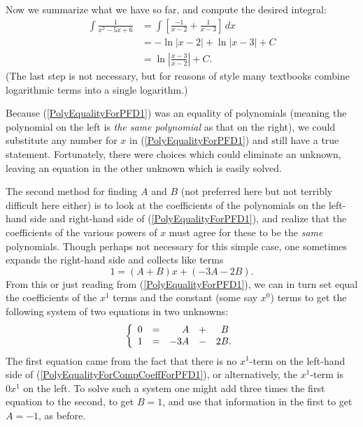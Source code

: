 Now we summarize what we have so far, and compute the desired integral:
\begin{align*}
\int\frac1{x^2-5x+6}&=\int\left[\frac{-1}{x-2}+\frac{1}{x-3}\right]\,dx\\
                    &=-\ln|x-2|+\ln|x-3|+C\\
                    &=\ln\left|\frac{x-3}{x-2}\right|+C.
\end{align*}
(The last step is not necessary, but for reasons of style
many textbooks combine logarithmic terms into a single logarithm.)
\eex

Because (\ref{PolyEqualityForPFD1}) was an equality of polynomials
(meaning the polynomial on the left is {\it the same polynomial}
as that on the right\footnotemark), we could substitute
any number for $x$ in (\ref{PolyEqualityForPFD1})
and still have a true statement.
Fortunately, there were choices which could eliminate 
an unknown, leaving an equation in the other unknown
which is easily solved.



The second method for finding $A$ and $B$ (not preferred here
but not terribly difficult here either) is to look at the
coefficients of the polynomials on the left-hand side and
right-hand side of (\ref{PolyEqualityForPFD1}),
and realize that the coefficients of the
various powers of $x$ must agree for these to be
the {\it same} polynomials.  Though perhaps not necessary for
this simple case, one sometimes expands the right-hand side
and collects like terms 
$$1=(A+B)x+(-3A-2B).$$
From this or just reading from (\ref{PolyEqualityForPFD1}),
we can in turn set equal the coefficients of the $x^1$ terms
and the constant (some
say $x^0$) terms to get the following system of two
equations in two unknowns:
\begin{equation}\left\{\begin{array}{rcrcr}
 0&=&A&+&B\hphantom{.}\\
 1&=&-3A&-&2B.\end{array}\right.\label{PolyEqualityForCompCoeffForPFD1}
\end{equation}
The first equation came from the fact that there is no $x^1$-term
on the left-hand side of (\ref{PolyEqualityForCompCoeffForPFD1}),
or alternatively, the $x^1$-term is $0x^1$ on the left.
To solve such a system one might add three times the
first equation to the second, to get $B=1$, and
use that information in the first to get $A=-1$, as before.

